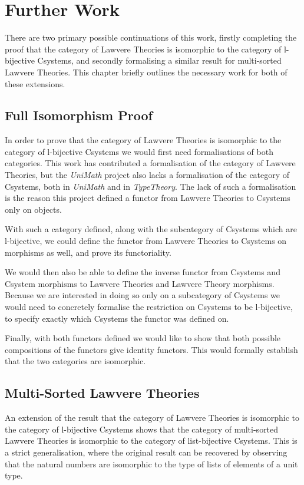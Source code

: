 \chapter{Further Work}
There are two primary possible continuations of this work, firstly completing
the proof that the category of Lawvere Theories is isomorphic to the category of
l-bijective Csystems, and secondly formalising a similar result for multi-sorted
Lawvere Theories. This chapter briefly outlines the necessary work for both of
these extensions.

\section{Full Isomorphism Proof}
In order to prove that the category of Lawvere Theories is isomorphic to the
category of l-bijective Csystems we would first need formalisations of both
categories. This work has contributed a formalisation of the category of Lawvere
Theories, but the \textit{UniMath} project also lacks a formalisation of the
category of Csystems, both in \textit{UniMath} and in \textit{TypeTheory}. The
lack of such a formalisation is the reason this project defined a functor from
Lawvere Theories to Csystems only on objects.

With such a category defined, along with the subcategory of Csystems which are
l\nobreakdash-bijective, we could define the functor from Lawvere Theories to Csystems on
morphisms as well, and prove its functoriality.

We would then also be able to define the inverse functor from Csystems and
Csystem morphisms to Lawvere Theories and Lawvere Theory morphisms. Because we
are interested in doing so only on a subcategory of Csystems we would need to
concretely formalise the restriction on Csystems to be l\nobreakdash-bijective,
to specify exactly which Csystems the functor was defined on.

Finally, with both functors defined we would like to show that both possible
compositions of the functors give identity functors. This would formally
establish that the two categories are isomorphic.

\section{Multi-Sorted Lawvere Theories}
An extension of the result that the category of Lawvere Theories is isomorphic
to the category of l-bijective Csystems shows that the category of multi-sorted
Lawvere Theories is isomorphic to the category of list-bijective
Csystems\cite{FioreVoevodsky}. This is a strict generalisation, where the
original result can be recovered by observing that the natural numbers are
isomorphic to the type of lists of elements of a unit type.